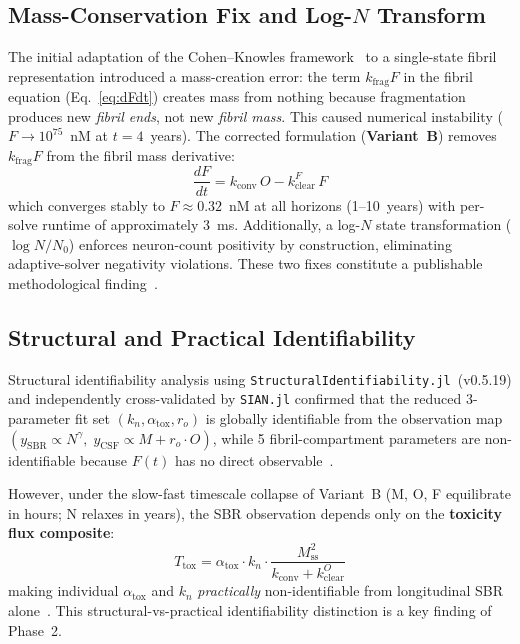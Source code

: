 \subsection{Mass-Conservation Fix and Log-$N$ Transform}

The initial adaptation of the Cohen--Knowles framework~\cite{cohen2012,knowles2009} to a single-state fibril representation introduced a mass-creation error: the term $k_\text{frag} F$ in the fibril equation (Eq.~\ref{eq:dFdt}) creates mass from nothing because fragmentation produces new \emph{fibril ends}, not new \emph{fibril mass}. This caused numerical instability ($F \to 10^{75}$~nM at $t=4$~years). The corrected formulation (\textbf{Variant~B}) removes $k_\text{frag} F$ from the fibril mass derivative:
\begin{equation}
\frac{dF}{dt} = k_\text{conv} \, O - k_\text{clear}^F \, F
\label{eq:dFdt-variantB}
\end{equation}
which converges stably to $F \approx 0.32$~nM at all horizons (1--10~years) with per-solve runtime of approximately 3~ms. Additionally, a log-$N$ state transformation ($\log N / N_0$) enforces neuron-count positivity by construction, eliminating adaptive-solver negativity violations. These two fixes constitute a publishable methodological finding~\cite{bakshi2018}.

\subsection{Structural and Practical Identifiability}

Structural identifiability analysis using \texttt{StructuralIdentifiability.jl}~(v0.5.19) and independently cross-validated by \texttt{SIAN.jl} confirmed that the reduced 3-parameter fit set $(k_n, \alpha_\text{tox}, r_o)$ is globally identifiable from the observation map $(y_\text{SBR} \propto N^\gamma,\; y_\text{CSF} \propto M + r_o \cdot O)$, while 5 fibril-compartment parameters are non-identifiable because $F(t)$ has no direct observable~\cite{villaverde2016}.

However, under the slow-fast timescale collapse of Variant~B (M, O, F equilibrate in hours; N relaxes in years), the SBR observation depends only on the \textbf{toxicity flux composite}:
\begin{equation}
T_\text{tox} = \alpha_\text{tox} \cdot k_n \cdot \frac{M_\text{ss}^2}{k_\text{conv} + k_\text{clear}^O}
\label{eq:T_tox}
\end{equation}
making individual $\alpha_\text{tox}$ and $k_n$ \emph{practically} non-identifiable from longitudinal SBR alone~\cite{raue2009,gutenkunst2007,transtrum2015}. This structural-vs-practical identifiability distinction is a key finding of Phase~2.


